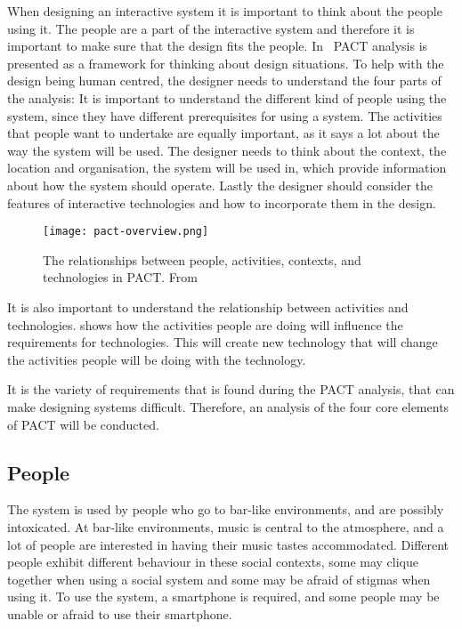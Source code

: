 When designing an interactive system it is important to think about the people using it. The people are a part of the interactive system and therefore it is important to make sure that the design fits the people. In~\cite{benyon2013designing} PACT analysis is presented as a framework for thinking about design situations. To help with the design being human centred, the designer needs to understand the four parts of the analysis: It is important to understand the different kind of people using the system, since they have different prerequisites for using a system. The activities that people want to undertake are equally important, as it says a lot about the way the system will be used. The designer needs to think about the context, the location and organisation, the system will be used in, which provide information about how the system should operate. Lastly the designer should consider the features of interactive technologies and how to incorporate them in the design.

\begin{figure}[hbtp]
  \centering
  \texttt{[image: pact-overview.png]}
  \caption{The relationships between people, activities, contexts, and technologies in PACT. From~\cite{benyon2013designing}}
  \label{fig:pact-overview}
\end{figure}

It is also important to understand the relationship between activities and technologies.  shows how the activities people are doing will influence the requirements for technologies. This will create new technology that will change the activities people will be doing with the technology.

It is the variety of requirements that is found during the PACT analysis, that can make designing systems difficult. Therefore, an analysis of the four core elements of PACT will be conducted.


\subsection{People}
\label{sub:pact_people}

The system is used by people who go to bar-like environments, and are possibly intoxicated. At bar-like environments, music is central to the atmosphere, and a lot of people are interested in having their music tastes accommodated. Different people exhibit different behaviour in these social contexts, some may clique together when using a social system and some may be afraid of stigmas when using it. To use the system, a smartphone is required, and some people may be unable or afraid  to use their smartphone.

